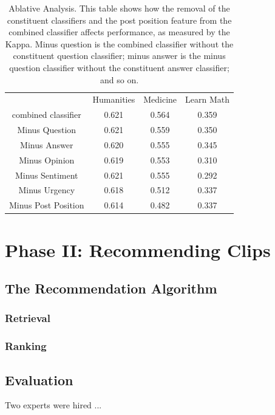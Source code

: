 \documentclass{edm_template}
\begin{document}
\begin{table}
\vspace{-40pt}
       \centering
       \begin{tabular}{|c|c|c|c|}
       \hline
                            & Humanities & Medicine & Learn Math \\ \cline{2-4}
       combined classifier  & 0.621      & 0.564    & 0.359 \\ \hline\hline
       Minus Question       & 0.621      & 0.559    & 0.350 \\ \hline
       Minus Answer         & 0.620      & 0.555    & 0.345 \\ \hline
       Minus Opinion        & 0.619      & 0.553    & 0.310 \\ \hline
       Minus Sentiment      & 0.621      & 0.555    & 0.292 \\ \hline
       Minus Urgency        & 0.618      & 0.512    & 0.337 \\ \hline
       Minus Post Position      & 0.614      & 0.482    & 0.337 \\ \hline
       \end{tabular}
       \caption{\textnormal{
       Ablative Analysis. This table shows how the removal of the constituent classifiers and the post position feature from the combined classifier affects performance, as measured by the Kappa. Minus question is the combined classifier without the constituent question classifier; minus answer is the minus question classifier without the constituent answer classifier; and so on.
       }} %
       \label{table:ablative} %
\end{table}


\section{Phase II: Recommending Clips}
\subsection{The Recommendation Algorithm}
\subsubsection{Retrieval}
\subsubsection{Ranking}

\subsection{Evaluation}
Two experts were hired ...
\end{document}
